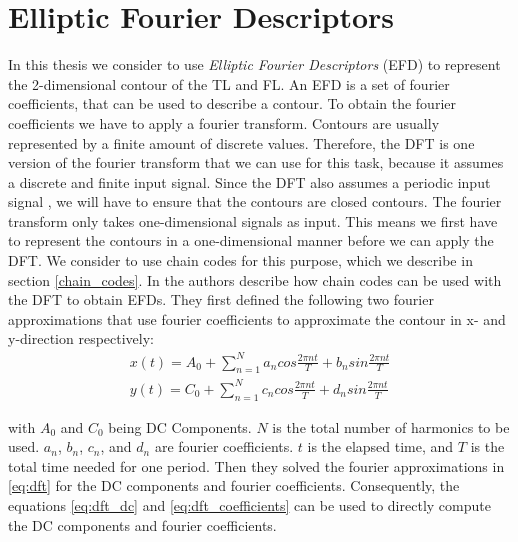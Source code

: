 \documentclass[thesis.tex]{subfiles}
\begin{document}

\section{Elliptic Fourier Descriptors}
In this thesis we consider to use \textit{Elliptic Fourier Descriptors} (EFD) \cite{giardinia} to represent the 2-dimensional contour of the TL and FL. An EFD is a set of fourier coefficients, that can be used to describe a contour. To obtain the fourier coefficients we have to apply a fourier transform. Contours are usually represented by a finite amount of discrete values. Therefore, the DFT is one version of the fourier transform that we can use for this task, because it assumes a discrete and finite input signal. Since the DFT also assumes a periodic input signal \cite{dspguide}, we will have to ensure that the contours are closed contours. The fourier transform only takes one-dimensional signals as input. This means we first have to represent the contours in a one-dimensional manner before we can apply the DFT. We consider to use chain codes for this purpose, which we describe in section \ref{chain_codes}. In \cite{giardinia} the authors describe how chain codes can be used with the DFT to obtain EFDs. They first defined the following two fourier approximations that use fourier coefficients to approximate the contour in x- and y-direction respectively:
\begin{equation} \label{eq:dft}
\begin{split}
 x(t) = A_0 + \sum_{n=1}^{N} a_n cos \frac{2\pi n t}{T} + b_n sin \frac{2\pi n t}{T} \\
 y(t) = C_0 + \sum_{n=1}^{N} c_n cos \frac{2\pi n t}{T} + d_n sin \frac{2\pi n t}{T}
\end{split}
\end{equation}

with $ A_0$ and $C_0 $ being DC Components. $N$ is the total number of harmonics to be used. $a_n$, $b_n$, $c_n$, and $d_n$ are fourier coefficients. $t$ is the elapsed time, and $T$ is the total time needed for one period.
Then they solved the fourier approximations in \ref{eq:dft} for the DC components and fourier coefficients. Consequently, the equations \ref{eq:dft_dc} and \ref{eq:dft_coefficients} can be used to directly compute the DC components and fourier coefficients. 
\end{document}
